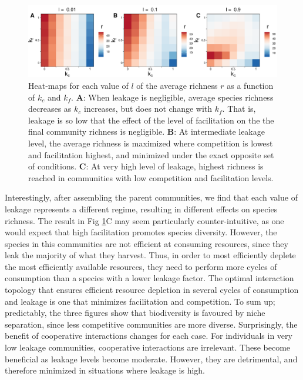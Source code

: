 \documentclass[12pt]{article}
\begin{document}
\begin{figure}[t]
	\centering
	\includegraphics[width=\textwidth]{kc_kf_richness.pdf}
	\caption{Heat-maps for each value of $ l $ of the average richness $ r $ as a function of $ k_c $ and $ k_f $. {\bf A}: When leakage is negligible, average species richness decreases as $ k_c $ increases, but does not change with $ k_f $. That is, leakage is so low that the effect of the level of facilitation on the the final community richness is negligible.  {\bf B}: At intermediate leakage level, the average richness is maximized  where competition is lowest and facilitation highest, and  minimized under the exact opposite set of conditions. {\bf C}: At very high level of leakage, highest richness is reached in communities with low competition and facilitation levels.} 
	\label{fig:kc_kf_richness}
\end{figure}

Interestingly, after assembling the parent communities, we find that each value of leakage represents a different regime, resulting in different effects on species richness. The result in Fig \ref{fig:kc_kf_richness}C may seem particularly counter-intuitive, as one would expect that high facilitation promotes species diversity. However, the species in  this communities are not efficient at consuming resources, since they leak the majority of what they harvest. Thus, in order to most efficiently deplete the most efficiently  available resources, they need to perform more cycles of consumption than a species with a lower leakage factor. The optimal interaction topology that ensures efficient resource depletion in several cycles of consumption and leakage is one that minimizes facilitation and competition.   
To sum up; predictably, the three figures show that biodiversity is favoured by niche separation, since less competitive communities are more diverse. Surprisingly, the benefit of cooperative interactions changes for each case. For individuals in very low leakage communities, cooperative interactions are irrelevant. These become beneficial as leakage levels become moderate. However, they are detrimental, and therefore minimized in situations where leakage is high.
\end{document}
